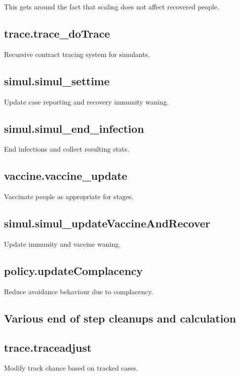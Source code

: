 \documentclass[]{article}
\begin{document}
This gets around the fact that scaling does not affect recovered people.

\subsection{trace.trace\_doTrace}
Recursive contract tracing system for simulants.

\subsection{simul.simul\_settime}
Update case reporting and recovery immunity waning.

\subsection{simul.simul\_end\_infection}
End infections and collect resulting stats.

\subsection{vaccine.vaccine\_update}
Vaccinate people as appropriate for stages.

\subsection{simul.simul\_updateVaccineAndRecover}
Update immunity and vaccine waning.

\subsection{policy.updateComplacency}
Reduce avoidance behaviour due to complacency.

\subsection{Various end of step cleanups and calculation}

\subsection{trace.traceadjust}
Modify track chance based on tracked cases.
\end{document}
